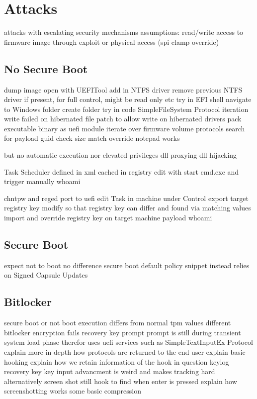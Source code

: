 
\chapter{Attacks}

attacks with escalating security mechanisms
assumptions:
read/write access to firmware image through
exploit or physical access (spi clamp override)

\section{No Secure Boot}
dump image
open with UEFITool
add in NTFS driver
remove previous NTFS driver if present, for full control, might be read only etc
try in EFI shell
navigate to Windows folder
create folder
try in code
SimpleFileSystem Protocol iteration
write failed on hibernated file
patch to allow write on hibernated drivers
pack executable binary as uefi module
iterate over firmware volume protocols
search for payload guid
check size match
override notepad works

but no automatic execution nor elevated privileges
dll proxying
dll hijacking

Task Scheduler
defined in xml
cached in registry
edit with start cmd.exe and trigger manually
whoami

chntpw and reged
port to uefi
edit Task in machine under Control
export target registry key
modify so that registry key can differ and found via matching values
import and override registry key on target machine
payload whoami


\section{Secure Boot}
expect not to boot
no difference
secure boot default policy snippet
instead relies on Signed Capsule Updates


\section{Bitlocker}
secure boot or not
boot execution differs from normal
tpm values different
bitlocker encryption fails
recovery key prompt
prompt is still during transient system load phase
therefor uses uefi services such as SimpleTextInputEx Protocol
explain more in depth how protocols are returned to the end user
explain basic hooking
explain how we retain information of the hook in question
keylog recovery key
key input advancment is weird and makes tracking hard
alternatively screen shot
still hook to find when enter is pressed
explain how screenshotting works
some basic compression

